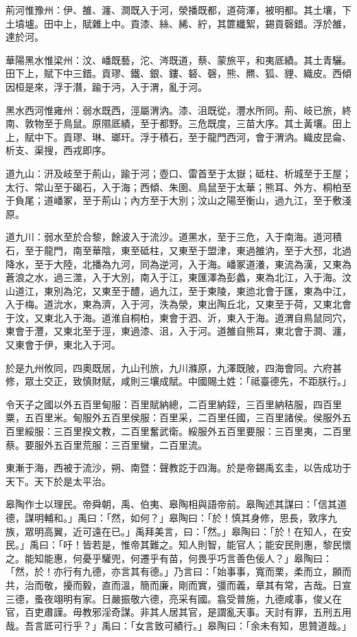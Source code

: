 \begin{pinyinscope}
荊河惟豫州：伊、雒、瀍、澗既入于河，滎播既都，道荷澤，被明都。其土壤，下土墳壚。田中上，賦雜上中。貢漆、絲、絺、紵，其篚纖絮，錫貢磬錯。浮於雒，達於河。

華陽黑水惟梁州：汶、嶓既藝，沱、涔既道，蔡、蒙旅平，和夷厎績。其土青驪。田下上，賦下中三錯。貢璆、鐵、銀、鏤、砮、磬，熊、羆、狐、貍、織皮。西傾因桓是來，浮于潛，踰于沔，入于渭，亂于河。

黑水西河惟雍州：弱水既西，涇屬渭汭。漆、沮既從，灃水所同。荊、岐已旅，終南、敦物至于鳥鼠。原隰厎績，至于都野。三危既度，三苗大序。其土黃壤。田上上，賦中下。貢璆、琳、瑯玕。浮于積石，至于龍門西河，會于渭汭。織皮昆侖、析支、渠搜，西戎即序。

道九山：汧及岐至于荊山，踰于河；壺口、雷首至于太嶽；砥柱、析城至于王屋；太行、常山至于碣石，入于海；西傾、朱圉、鳥鼠至于太華；熊耳、外方、桐柏至于負尾；道嶓冢，至于荊山；內方至于大別；汶山之陽至衡山，過九江，至于敷淺原。

道九川：弱水至於合黎，餘波入于流沙。道黑水，至于三危，入于南海。道河積石，至于龍門，南至華陰，東至砥柱，又東至于盟津，東過雒汭，至于大邳，北過降水，至于大陸，北播為九河，同為逆河，入于海。嶓冢道瀁，東流為漢，又東為蒼浪之水，過三澨，入于大別，南入于江，東匯澤為彭蠡，東為北江，入于海。汶山道江，東別為沱，又東至于醴，過九江，至于東陵，東迆北會于匯，東為中江，入于梅。道沇水，東為濟，入于河，泆為滎，東出陶丘北，又東至于荷，又東北會于汶，又東北入于海。道淮自桐柏，東會于泗、沂，東入于海。道渭自鳥鼠同穴，東會于灃，又東北至于涇，東過漆、沮，入于河。道雒自熊耳，東北會于澗、瀍，又東會于伊，東北入于河。

於是九州攸同，四奧既居，九山刊旅，九川滌原，九澤既陂，四海會同。六府甚修，眾土交正，致慎財賦，咸則三壤成賦。中國賜土姓：「祗臺德先，不距朕行。」

令天子之國以外五百里甸服：百里賦納總，二百里納銍，三百里納秸服，四百里粟，五百里米。甸服外五百里侯服：百里采，二百里任國，三百里諸侯。侯服外五百里綏服：三百里揆文教，二百里奮武衛。綏服外五百里要服：三百里夷，二百里蔡。要服外五百里荒服：三百里蠻，二百里流。

東漸于海，西被于流沙，朔、南暨：聲教訖于四海。於是帝錫禹玄圭，以告成功于天下。天下於是太平治。

皋陶作士以理民。帝舜朝，禹、伯夷、皋陶相與語帝前。皋陶述其謀曰：「信其道德，謀明輔和。」禹曰：「然，如何？」皋陶曰：「於！慎其身修，思長，敦序九族，眾明高翼，近可遠在已。」禹拜美言，曰：「然。」皋陶曰：「於！在知人，在安民。」禹曰：「吁！皆若是，惟帝其難之。知人則智，能官人；能安民則惠，黎民懷之。能知能惠，何憂乎驩兜，何遷乎有苗，何畏乎巧言善色佞人？」皋陶曰：「然，於！亦行有九德，亦言其有德。」乃言曰：「始事事，寬而栗，柔而立，願而共，治而敬，擾而毅，直而溫，簡而廉，剛而實，彊而義，章其有常，吉哉。日宣三德，蚤夜翊明有家。日嚴振敬六德，亮采有國。翕受普施，九德咸事，俊乂在官，百吏肅謹。毋教邪淫奇謀。非其人居其官，是謂亂天事。天討有罪，五刑五用哉。吾言厎可行乎？」禹曰：「女言致可績行。」皋陶曰：「余未有知，思贊道哉。」


\end{pinyinscope}
